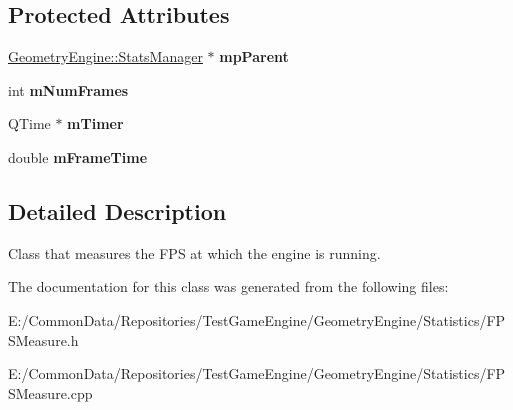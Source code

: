 \subsection*{Protected Attributes}
\begin{DoxyCompactItemize}
\item 
\mbox{\label{class_geometry_engine_1_1_geometry_statistics_1_1_f_p_s_measure_a63a8ef87b100ab333a6e9a88d174d54c}} 
\mbox{\hyperlink{class_geometry_engine_1_1_stats_manager}{Geometry\+Engine\+::\+Stats\+Manager}} $\ast$ {\bfseries mp\+Parent}
\item 
\mbox{\label{class_geometry_engine_1_1_geometry_statistics_1_1_f_p_s_measure_a041e1ca2802c707e4ab86eb6661bea48}} 
int {\bfseries m\+Num\+Frames}
\item 
\mbox{\label{class_geometry_engine_1_1_geometry_statistics_1_1_f_p_s_measure_a9a1a2c6ed96cf48368eaa386257037ea}} 
Q\+Time $\ast$ {\bfseries m\+Timer}
\item 
\mbox{\label{class_geometry_engine_1_1_geometry_statistics_1_1_f_p_s_measure_a3b8bfcb47b470184e4aa4d4d78ea6f40}} 
double {\bfseries m\+Frame\+Time}
\end{DoxyCompactItemize}


\subsection{Detailed Description}
Class that measures the F\+PS at which the engine is running. 

The documentation for this class was generated from the following files\+:\begin{DoxyCompactItemize}
\item 
E\+:/\+Common\+Data/\+Repositories/\+Test\+Game\+Engine/\+Geometry\+Engine/\+Statistics/F\+P\+S\+Measure.\+h\item 
E\+:/\+Common\+Data/\+Repositories/\+Test\+Game\+Engine/\+Geometry\+Engine/\+Statistics/F\+P\+S\+Measure.\+cpp\end{DoxyCompactItemize}
